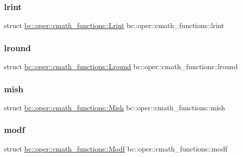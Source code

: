 \subsubsection{\texorpdfstring{lrint}{lrint}}
{\footnotesize\ttfamily struct \hyperlink{structbc_1_1oper_1_1cmath__functions_1_1Lrint}{bc\+::oper\+::cmath\+\_\+functions\+::\+Lrint}   bc\+::oper\+::cmath\+\_\+functions\+::lrint}

\mbox{\label{namespacebc_1_1oper_1_1cmath__functions_a5f6b26820adb4724d6fea95b4e8c373e}} 
\subsubsection{\texorpdfstring{lround}{lround}}
{\footnotesize\ttfamily struct \hyperlink{structbc_1_1oper_1_1cmath__functions_1_1Lround}{bc\+::oper\+::cmath\+\_\+functions\+::\+Lround}   bc\+::oper\+::cmath\+\_\+functions\+::lround}

\mbox{\label{namespacebc_1_1oper_1_1cmath__functions_a02c2fece5de769cc83e216e21288196b}} 
\subsubsection{\texorpdfstring{mish}{mish}}
{\footnotesize\ttfamily struct \hyperlink{structbc_1_1oper_1_1cmath__functions_1_1Mish}{bc\+::oper\+::cmath\+\_\+functions\+::\+Mish}   bc\+::oper\+::cmath\+\_\+functions\+::mish}

\mbox{\label{namespacebc_1_1oper_1_1cmath__functions_aab51eba46d303ea9e4e041660b1354e5}} 
\subsubsection{\texorpdfstring{modf}{modf}}
{\footnotesize\ttfamily struct \hyperlink{structbc_1_1oper_1_1cmath__functions_1_1Modf}{bc\+::oper\+::cmath\+\_\+functions\+::\+Modf}   bc\+::oper\+::cmath\+\_\+functions\+::modf}

